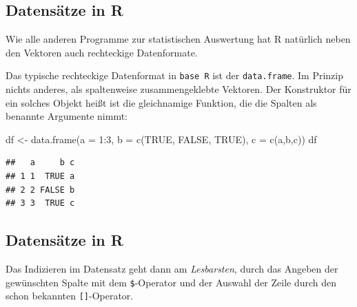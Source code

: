 \documentclass[
]{book}
\newenvironment{Shaded}{\begin{snugshade}}{\end{snugshade}}
\newcommand{\AttributeTok}[1]{\textcolor[rgb]{0.77,0.63,0.00}{#1}}
\newcommand{\ConstantTok}[1]{\textcolor[rgb]{0.00,0.00,0.00}{#1}}
\newcommand{\DecValTok}[1]{\textcolor[rgb]{0.00,0.00,0.81}{#1}}
\newcommand{\DocumentationTok}[1]{\textcolor[rgb]{0.56,0.35,0.01}{\textbf{\textit{#1}}}}
\newcommand{\FunctionTok}[1]{\textcolor[rgb]{0.00,0.00,0.00}{#1}}
\newcommand{\NormalTok}[1]{#1}
\newcommand{\OtherTok}[1]{\textcolor[rgb]{0.56,0.35,0.01}{#1}}
\newcommand{\SpecialCharTok}[1]{\textcolor[rgb]{0.00,0.00,0.00}{#1}}
\newcommand{\StringTok}[1]{\textcolor[rgb]{0.31,0.60,0.02}{#1}}
\begin{document}
\hypertarget{datensuxe4tze-in-r}{%
\subsection{Datensätze in R}\label{datensuxe4tze-in-r}}

Wie alle anderen Programme zur statistischen Auswertung hat R natürlich neben den Vektoren auch rechteckige Datenformate.

Das typische rechteckige Datenformat in \texttt{base\ R} ist der \texttt{data.frame}. Im Prinzip nichts anderes, als spaltenweise zusammengeklebte Vektoren.
Der Konstruktor für ein solches Objekt heißt ist die gleichnamige Funktion, die die Spalten als benannte Argumente nimmt:

\begin{Shaded}
\begin{Highlighting}[]
\NormalTok{df }\OtherTok{\textless{}{-}} \FunctionTok{data.frame}\NormalTok{(}\AttributeTok{a =} \DecValTok{1}\SpecialCharTok{:}\DecValTok{3}\NormalTok{,}
                 \AttributeTok{b =} \FunctionTok{c}\NormalTok{(}\ConstantTok{TRUE}\NormalTok{, }\ConstantTok{FALSE}\NormalTok{, }\ConstantTok{TRUE}\NormalTok{),}
                 \AttributeTok{c =} \FunctionTok{c}\NormalTok{(}\StringTok{\textquotesingle{}a\textquotesingle{}}\NormalTok{,}\StringTok{\textquotesingle{}b\textquotesingle{}}\NormalTok{,}\StringTok{\textquotesingle{}c\textquotesingle{}}\NormalTok{))}
\NormalTok{df}
\end{Highlighting}
\end{Shaded}

\begin{verbatim}
##   a     b c
## 1 1  TRUE a
## 2 2 FALSE b
## 3 3  TRUE c
\end{verbatim}

\hypertarget{datensuxe4tze-in-r-1}{%
\subsection{Datensätze in R}\label{datensuxe4tze-in-r-1}}

Das Indizieren im Datensatz geht dann am \emph{Lesbarsten}, durch das Angeben der gewünschten Spalte mit dem \texttt{\$}-Operator und der Auswahl der Zeile durch den schon bekannten \texttt{{[}{]}}-Operator.

\begin{Shaded}
\end{Shaded}
\end{document}
